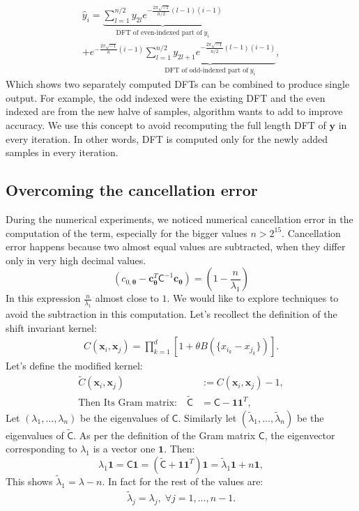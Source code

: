 \documentclass[twocolumn]{svjour3}          %
\newcommand{\bm}[1]{\boldsymbol{#1}}
\newcommand{\vtheta}{{\bm{\theta}}}
\newcommand{\vc}{\bm{c}}
\newcommand{\vx}{\bm{x}}
\newcommand{\vy}{\bm{y}}
\newcommand{\vone}{\bm{1}}
\newcommand{\mC}{\mathsf{C}}
\newcommand{\mCInv}{{\mathsf{C}^{-1}}}
\newcommand{\tmC}{\widetilde{\mathsf{C}}}
\newcommand{\tlambda}{\tilde{\lambda}}
\begin{document}
\begin{multline*}
\hat{y}_i =  
\underbrace{
\sum_{l=1}^{n/2} y_{2l} 
e^{- \frac{2\pi \sqrt{-1}}{n/2} (l-1)( i-1) }
}_{\text{DFT of even-indexed part of}\; y_i}
\\
+
e^{- \frac{2\pi \sqrt{-1}}{n} (i-1) }
\underbrace{
\sum_{l=1}^{n/2} y_{2l+1} 
e^{- \frac{2\pi \sqrt{-1}}{n/2} (l-1)( i-1) }
}_{\text{DFT of odd-indexed part of}\; y_i},
\end{multline*}
Which shows two separately computed DFTs can be combined to produce single output. For example, the odd indexed were the existing DFT and the even indexed are from the new halve of samples, algorithm wants to add to improve accuracy.
We use this concept to avoid recomputing the full length DFT of $\vy$ in every iteration. In other words, DFT is computed only for the newly added samples in every iteration.















\subsection{Overcoming the cancellation error}
During the numerical experiments, we noticed numerical cancellation error in the computation of the term, especially for the bigger values $n > 2^{15}$. Cancellation error happens because two almost equal values are subtracted, when they differ only in very high decimal values. 
\[
\left(c_{0,\vtheta} - {\vc}_{\vtheta}^T\mCInv\vc_{\vtheta} \right) = 
\left(
1 - \frac{n }{\lambda_1} \right)
\]
In this expression $\frac{n}{\lambda_1}$ almost close to $1$.
We would like to explore techniques to avoid the subtraction in this computation.
Let's recollect the definition of the shift invariant kernel:
\begin{align*}
C(\vx_i, \vx_j) = \prod_{k=1}^d \left[1 + \theta B(\{x_{i_k} - x_{j_k}\}) \right].
\end{align*}
Let's define the modified kernel:
\begin{align*}
\widetilde{C}(\vx_i, \vx_j) &:= C(\vx_i, \vx_j) - 1,
\\
\text{Then Its Gram matrix:} \quad \tmC &= \mC - \vone \vone^T,
\end{align*}
Let $(\lambda_1, ..., \lambda_n)$ be the eigenvalues of $\mC$. Similarly let $(\tlambda_1, ..., \tlambda_n)$ be the eigenvalues of $\tmC$. As per the definition of the Gram matrix $\mC$, the eigenvector corresponding to $\lambda_1$ is a vector one $\vone$. 
Then:
\begin{equation}
\nonumber
\lambda_1 \vone  = \mC \vone 
 = (\tmC + \vone \vone^T) \vone
 = \tlambda_1 \vone + n \vone,
\end{equation}
This shows $\tlambda_1 = \lambda - n$. In fact for the rest of the values are:
\begin{align}
\label{eqn:lambda_to_tlambda_relation}
\tlambda_j = \lambda_j, \; \forall j=1,...,n-1.
\end{align}
\end{document}
